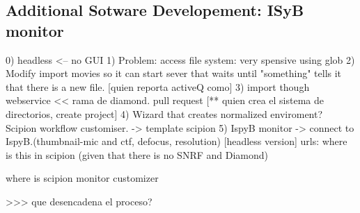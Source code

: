 \subsection{Additional Sotware Developement: ISyB monitor}

0) headless <-- no GUI
1) Problem: access file system: very spensive using glob
2) Modify import movies so it can start  sever that waits until "something" tells it that there is a new file. [quien reporta activeQ como]
3) import though webservice << rama de diamond. pull request
[** quien crea el sistema de directorios, create project]
4) Wizard that creates normalized enviroment? Scipion workflow customiser. -> template scipion
5) IspyB monitor -> connect to IspyB.(thumbnail-mic and ctf, defocus, resolution)
[headless version]
urls: where is this in scipion (given that there is no SNRF and Diamond)

where is scipion monitor customizer


>>> que desencadena el proceso?
